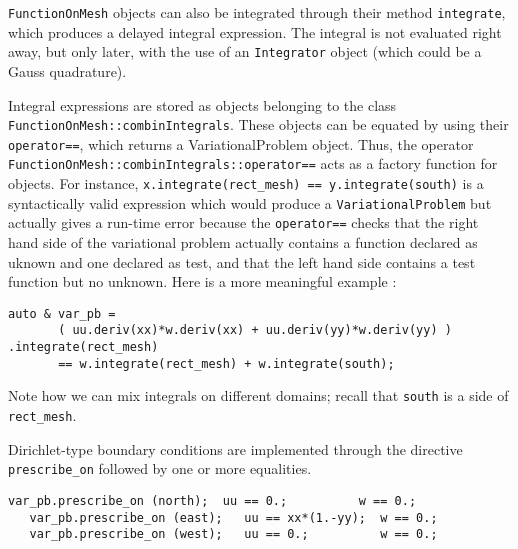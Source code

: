 {\small\tt FunctionOnMesh} objects can also be integrated through their method
{\small\tt integrate}, which produces a delayed integral expression.
The integral is not evaluated right away, but only later, with the use of an
{\small\tt Integrator} object (which could be a Gauss quadrature).

Integral expressions are stored as objects belonging to the class\hfil\break
{\small\tt FunctionOnMesh::combinIntegrals}.
These objects can be equated by using their\hfil\break
{\small\tt operator==}, which returns a {VariationalProblem} object.
Thus, the operator\hfil\break
{\small\tt FunctionOnMesh::combinIntegrals::operator==} acts as a factory function
for\hfil{} objects.
For instance, {\small\tt x.integrate(rect\_mesh) == y.integrate(south)} is a syntactically valid
expression which would produce a {\small\tt VariationalProblem} but actually
gives a run-time error because the {\small\tt operator==} checks that the right hand side
of the variational problem actually contains a function declared as uknown and one
declared as test, and that the left hand side contains a test function but no unknown.
Here is a more meaningful example :

\begin{Verbatim}[commandchars=\\\{\},formatcom=\small\tt,
   baselinestretch=0.94,framesep=2mm                      ]
   auto & var_pb =
       ( uu.deriv(xx)*w.deriv(xx) + uu.deriv(yy)*w.deriv(yy) ) .integrate(rect_mesh)
       == w.integrate(rect_mesh) + w.integrate(south);
\end{Verbatim}

Note how we can mix integrals on different domains; recall that {\small\tt south} is
a side of {\small\tt rect\_mesh}.

Dirichlet-type boundary conditions are implemented through the directive
{\small\tt prescribe\_on} followed by one or more equalities.

\begin{Verbatim}[commandchars=\\\{\},formatcom=\small\tt,
   baselinestretch=0.94,framesep=2mm                      ] 
   var_pb.prescribe_on (north);  uu == 0.;          w == 0.;
   var_pb.prescribe_on (east);   uu == xx*(1.-yy);  w == 0.;
   var_pb.prescribe_on (west);   uu == 0.;          w == 0.;
\end{Verbatim}


